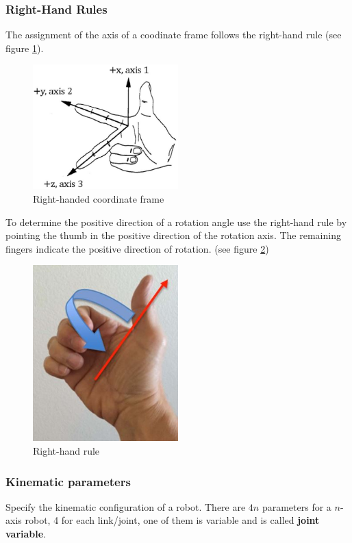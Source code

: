 \documentclass[12pt]{article}
\begin{document}
	\subsubsection{Right-Hand Rules}
	The assignment of the axis of a coodinate frame follows the right-hand rule (see figure \ref{fig:right-hand-frame}).\\
	\begin{figure}[h]
		\includegraphics[width=0.5\textwidth]{figures/right-hand-frame.JPG}
		\caption{Right-handed coordinate frame}
		\label{fig:right-hand-frame}
	\end{figure}
	To determine the positive direction of a rotation angle use the right-hand rule by pointing the thumb in the positive direction of the rotation axis. The remaining fingers indicate the positive direction of rotation. (see figure \ref{fig:right-hand-rule})
	\begin{figure}[h]
		\includegraphics[width=0.5\textwidth]{figures/right-hand-rule.JPG}
		\caption{Right-hand rule}
		\label{fig:right-hand-rule}
	\end{figure}
	
	\subsubsection{Kinematic parameters}
	Specify the kinematic configuration of a robot. There are $4n$ parameters for a $n$-axis robot, 4 for each link/joint, one of them is variable and is called \textbf{joint variable}.
	
\end{document}
